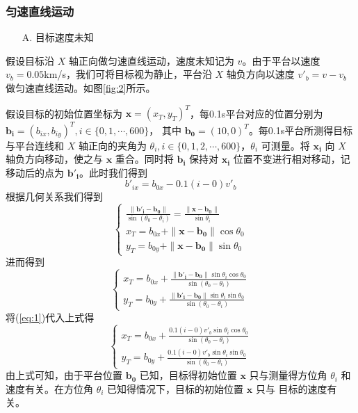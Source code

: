 \documentclass[UTF8]{ctexart}
\begin{document}
\subsubsection{匀速直线运动}
\begin{enumerate}
    \item[A.] 目标速度未知
\end{enumerate} 

假设目标沿 $X$ 轴正向做匀速直线运动，速度未知记为 $v$。由于平台以速度 $v_b = 0.05$km/s，我们可将目标视为静止，平台沿 $X$ 轴负方向以速度 $v'_b = v-v_b$ 做匀速直线运动。如图\ref{fig:2}所示。

假设目标的初始位置坐标为 $\bm{x}=(x_T,y_T)^T$，每0.1s平台对应的位置分别为 $\bm{b_i}=(b_{ix},b_{iy})^T, i \in \lbrace 0,1,\cdots,600 \rbrace$，
其中 $\bm{b_0} = (10,0)^T$。每0.1s平台所测得目标与平台连线和 $X$ 轴正向的夹角为 $\theta_i,i \in \lbrace 0,1,2,\cdots,600 \rbrace$，$\theta_i$ 可测量。将 $\bm{x_i}$ 向 $X$ 轴负方向移动，使之与 $\bm{x}$ 重合。同时将 $\bm{b_i}$
保持对 $\bm{x_i}$ 位置不变进行相对移动，记移动后的点为 $\bm{b'_i}$。此时我们得到
\begin{equation}
    b'_{ix} = b_{0x} -0.1(i-0) v'_b \label{eq:1}
\end{equation}
根据几何关系我们得到
\begin{equation}
    \begin{cases}
        \frac{\|\bm{b'_i} - \bm{b_0} \|}{\sin (\theta_0 - \theta_i)} = \frac{\| \bm{x}-\bm{b_0} \| }{\sin \theta_i}\\
        x_T = b_{0x} + \| \bm{x} - \bm{b_0} \| \cos \theta_0 \\
        y_T = b_{0y} + \| \bm{x} - \bm{b_0} \| \sin \theta_0
    \end{cases}
\end{equation}
进而得到
\begin{equation}
    \begin{cases}
        x_T = b_{0x} + \frac{\| \bm{b'_i} - \bm{b_0} \| \sin \theta_i \cos \theta_0}{\sin (\theta_0 - \theta_i)} \\ 
        y_T = b_{0y} + \frac{\| \bm{b'_i} - \bm{b_0} \| \sin \theta_i \sin \theta_0}{\sin (\theta_0 - \theta_i)}
    \end{cases}
\end{equation}
将(\ref{eq:1})代入上式得
\begin{equation}
    \begin{cases}
        x_T = b_{0x} + \frac{0.1 (i-0)v'_b \sin \theta_i \cos \theta_0}{\sin (\theta_0 - \theta_i)} \\ 
        y_T = b_{0y} + \frac{0.1 (i-0)v'_b \sin \theta_i \sin \theta_0}{\sin (\theta_0 - \theta_i)}
    \end{cases}
\end{equation}
由上式可知，由于平台位置 $\bm{b_0}$ 已知，目标得初始位置 $\bm{x}$ 只与测量得方位角 $\theta_i$ 和 速度有关。在方位角 $\theta_i$ 已知得情况下，目标的初始位置 $\bm{x}$ 只与 目标的速度有关。
\end{document}
